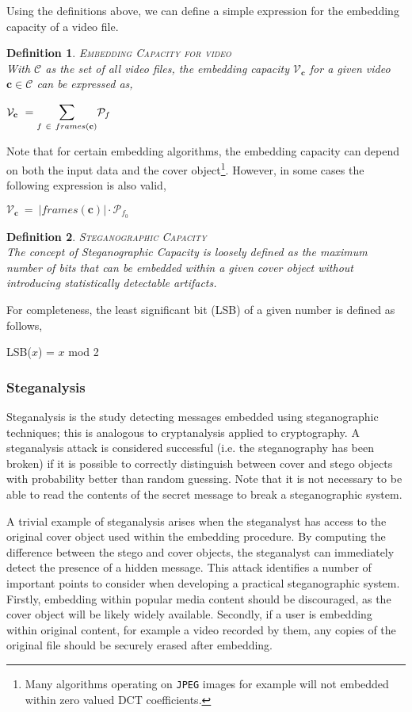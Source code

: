 \documentclass[paper=a4, fontsize=11pt,twoside]{scrartcl}    %
\newtheorem{ddef}{Definition}[section]
\begin{document}
Using the definitions above, we can define a simple expression for the embedding capacity of a video file. 
\begin{ddef}
\textsc{Embedding Capacity for video}\\[5pt]
With $\mathcal{C}$ as the set of all video files, the embedding capacity $\mathcal{V} _{\textbf{c}}$ for a given video $\textbf{c} \in \mathcal{C}$ can be expressed as,
\begin{center}
	$\mathcal{V} _{\textbf{c}} ~= \mathlarger{\mathlarger{\sum}}\limits_{f ~\in ~frames(\textbf{c})} \mathcal{P} _{f}$
\end{center}
\end{ddef}
\noindent
Note that for certain embedding algorithms, the embedding capacity can depend on both the input data and the cover object\footnote{Many algorithms operating on \texttt{JPEG} images for example will not embedded within zero valued DCT coefficients.}. However, in some cases the following expression is also valid,
\begin{center}
	$\mathcal{V} _{\textbf{c}} ~=~ |frames(\textbf{c})| \cdot \mathcal{P} _{f _{0}}$
\end{center}

\begin{ddef}
\textsc{Steganographic Capacity}\\[5pt]
The concept of Steganographic Capacity is loosely defined as the maximum number of bits that can be embedded within a given cover object without introducing statistically detectable artifacts. %
\end{ddef}
\noindent
For completeness, the least significant bit (LSB) of a given number is defined as follows,
\begin{center}
	LSB($x$) = $x$ mod 2
\end{center}
\subsubsection{Steganalysis}
Steganalysis is the study detecting messages embedded using steganographic techniques; this is analogous to cryptanalysis applied to cryptography. A steganalysis attack is considered successful (i.e. the steganography has been broken) if it is possible to correctly distinguish between cover and stego objects with probability better than random guessing. Note that it is not necessary to be able to read the contents of the secret message to break a steganographic system.

A trivial example of steganalysis arises when the steganalyst has access to the original cover object used within the embedding procedure. By computing the difference between the stego and cover objects, the steganalyst can immediately detect the presence of a hidden message. This attack identifies a number of important points to consider when developing a practical steganographic system. Firstly, embedding within popular media content should be discouraged, as the cover object will be likely widely available. Secondly, if a user is embedding within original content, for example a video recorded by them, any copies of the original file should be securely erased after embedding.
\end{document}
